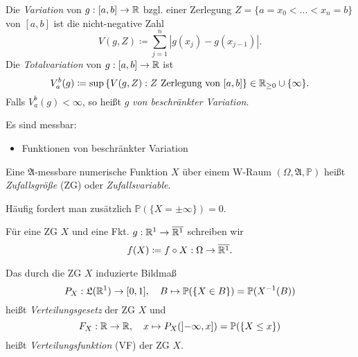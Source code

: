 \documentclass{cheat-sheet}
\newcommand{\Alg}{\mathfrak{A}} %
\newcommand{\LebAlg}{\mathfrak{L}} %
\renewcommand{\P}{\mathbb{P}} %
\renewcommand{\ER}{\overline{\R^1}} %
\begin{document}
\begin{defn}
  Die \emph{Variation} von $g : [a, b] \to \mathbb{R}$ bzgl. einer Zerlegung $Z = \{ a = x_0 < ... < x_n = b \}$ von $[a, b]$ ist die nicht-negative Zahl
  \[ V(g, Z) \coloneqq \sum_{j=1}^{n} |g(x_j) - g(x_{j-1})|. \]
  Die \emph{Totalvariation} von $g : [a, b] \to \mathbb{R}$ ist
  \[ V_a^b(g) \coloneqq \sup\left\{ V(g, Z) : Z \text{ Zerlegung von } [a, b] \right\} \in \mathbb{R}_{\ge 0} \cup \{ \infty \}. \]
  Falls $V_a^b(g) < \infty$, so heißt $g$ \emph{von beschränkter Variation}.
\end{defn}

\begin{satz}
  Es sind messbar:
  \begin{itemize}
    \item Funktionen von beschränkter Variation
  \end{itemize}
\end{satz}

\begin{defn}
  Eine $\Alg$-messbare numerische Funktion $X$ über einem W-Raum $(\Omega, \Alg, \P)$ heißt \emph{Zufallsgröße} (ZG) oder \emph{Zufallsvariable}.
\end{defn}


\begin{bem}
  Häufig fordert man zusätzlich $\P(\{ X = \pm \infty \}) = 0$.
\end{bem}

\begin{nota}
  Für eine ZG $X$ und eine Fkt. $g : \R^1 \to \ER$ schreiben wir
  \[ f(X) \coloneqq f \circ X : \Omega \to \ER. \]
\end{nota}

\begin{defn}
  Das durch die ZG $X$ induzierte Bildmaß
  \[ P_X : \LebAlg(\R^1) \to [0,1], \quad B \mapsto \P(\{ X \in B \}) = \P(X^{-1}(B)) \]
  heißt \emph{Verteilungsgesetz} der ZG $X$ und
  \[ F_X : \R \to \R, \quad x \mapsto P_X(\left]-\infty, x\right]) = \P(\{ X \leq x \}) \]
  heißt \emph{Verteilungsfunktion} (VF) der ZG $X$.
\end{defn}

\end{document}
